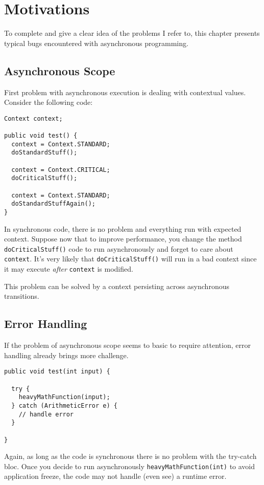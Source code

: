 
\chapter{Motivations}
\label{ch:motiv}
To complete and give a clear idea of the problems I refer to, this chapter presents typical bugs encountered with asynchronous programming.

\section{Asynchronous Scope}

First problem with asynchronous execution is dealing with contextual values. Consider the following code:

\begin{lstlisting}
Context context;

public void test() {
  context = Context.STANDARD;
  doStandardStuff();

  context = Context.CRITICAL;
  doCriticalStuff();

  context = Context.STANDARD;
  doStandardStuffAgain();
}
\end{lstlisting}

In synchronous code, there is no problem and everything run with expected context. Suppose now that to improve performance, you change the method \lstinline{doCriticalStuff()} code to run asynchronously and forget to care about \lstinline{context}. It's very likely that \lstinline{doCriticalStuff()} will run in a bad context since it may execute \emph{after} \lstinline{context} is modified.


This problem can be solved by a context persisting across asynchronous transitions.


\section{Error Handling}

If the problem of asynchronous scope seems to basic to require attention, error handling already brings more challenge.

\begin{lstlisting}
public void test(int input) {
  
  try {
    heavyMathFunction(input);
  } catch (ArithmeticError e) {
    // handle error
  }

}
\end{lstlisting}

Again, as long as the code is synchronous there is no problem with the try-catch bloc. Once you decide to run asynchronously \lstinline{heavyMathFunction(int)} to avoid application freeze, the code may not handle (even see) a runtime error.

